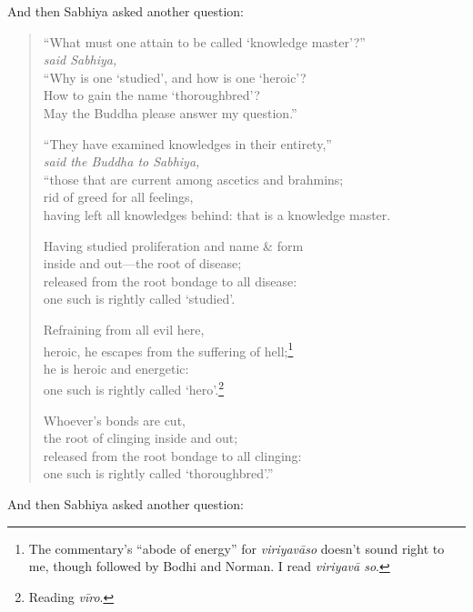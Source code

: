 \documentclass[12pt,openany]{book}%
\newcommand*{\scspeaker}[1]{\hspace{2em}\textit{#1}}
\begin{document}
And then Sabhiya asked another question: 

\begin{verse}%
“What must one attain to be called ‘knowledge master’?” \\
\scspeaker{said Sabhiya, }\\
“Why is one ‘studied’, and how is one ‘heroic’? \\
How to gain the name ‘thoroughbred’? \\
May the Buddha please answer my question.” 

“They have examined knowledges in their entirety,” \\
\scspeaker{said the Buddha to Sabhiya, }\\
“those that are current among ascetics and brahmins; \\
rid of greed for all feelings, \\
having left all knowledges behind: that is a knowledge master. 

Having studied proliferation and name \& form \\
inside and out—the root of disease; \\
released from the root bondage to all disease: \\
one such is rightly called ‘studied’. 

Refraining from all evil here, \\
heroic, he escapes from the suffering of hell;\footnote{The commentary’s “abode of energy” for \textit{\textsanskrit{viriyavāso}} doesn’t sound right to me, though followed by Bodhi and Norman. I read \textit{\textsanskrit{viriyavā} so}. } \\
he is heroic and energetic: \\
one such is rightly called ‘hero’.\footnote{Reading \textit{\textsanskrit{vīro}}. } 

Whoever’s bonds are cut, \\
the root of clinging inside and out; \\
released from the root bondage to all clinging: \\
one such is rightly called ‘thoroughbred’.” 

%
\end{verse}

And then Sabhiya asked another question: 
\end{document}
